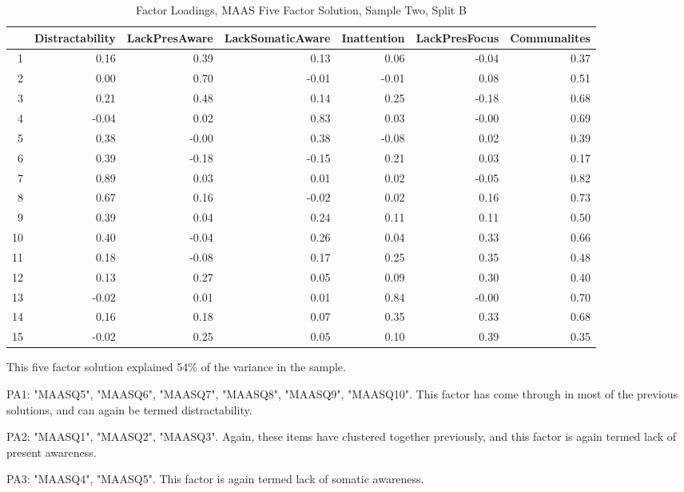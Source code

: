 \documentclass{article}
\begin{document}
\begin{table}[ht]
\centering
\begin{tabular}{rrrrrrr}
  \hline
 & Distractability & LackPresAware & LackSomaticAware & Inattention & LackPresFocus & Communalites \\ 
  \hline
1 & 0.16 & 0.39 & 0.13 & 0.06 & -0.04 & 0.37 \\ 
  2 & 0.00 & 0.70 & -0.01 & -0.01 & 0.08 & 0.51 \\ 
  3 & 0.21 & 0.48 & 0.14 & 0.25 & -0.18 & 0.68 \\ 
  4 & -0.04 & 0.02 & 0.83 & 0.03 & -0.00 & 0.69 \\ 
  5 & 0.38 & -0.00 & 0.38 & -0.08 & 0.02 & 0.39 \\ 
  6 & 0.39 & -0.18 & -0.15 & 0.21 & 0.03 & 0.17 \\ 
  7 & 0.89 & 0.03 & 0.01 & 0.02 & -0.05 & 0.82 \\ 
  8 & 0.67 & 0.16 & -0.02 & 0.02 & 0.16 & 0.73 \\ 
  9 & 0.39 & 0.04 & 0.24 & 0.11 & 0.11 & 0.50 \\ 
  10 & 0.40 & -0.04 & 0.26 & 0.04 & 0.33 & 0.66 \\ 
  11 & 0.18 & -0.08 & 0.17 & 0.25 & 0.35 & 0.48 \\ 
  12 & 0.13 & 0.27 & 0.05 & 0.09 & 0.30 & 0.40 \\ 
  13 & -0.02 & 0.01 & 0.01 & 0.84 & -0.00 & 0.70 \\ 
  14 & 0.16 & 0.18 & 0.07 & 0.35 & 0.33 & 0.68 \\ 
  15 & -0.02 & 0.25 & 0.05 & 0.10 & 0.39 & 0.35 \\ 
   \hline
\end{tabular}
\caption{Factor Loadings, MAAS Five Factor Solution, Sample Two, Split B} 
\label{tab:tcq2bmaasfact5}
\end{table}This five factor solution explained 54\% of the variance in the sample.

PA1: "MAASQ5",  "MAASQ6",  "MAASQ7",  "MAASQ8",  "MAASQ9",  "MAASQ10".  This factor has come through in most of the previous solutions, and can again be termed distractability.

PA2: "MAASQ1", "MAASQ2", "MAASQ3".  Again, these items have clustered together previously, and this factor is again termed lack of present awareness.

PA3: "MAASQ4", "MAASQ5".  This factor is again termed lack of somatic awareness.
\end{document}
